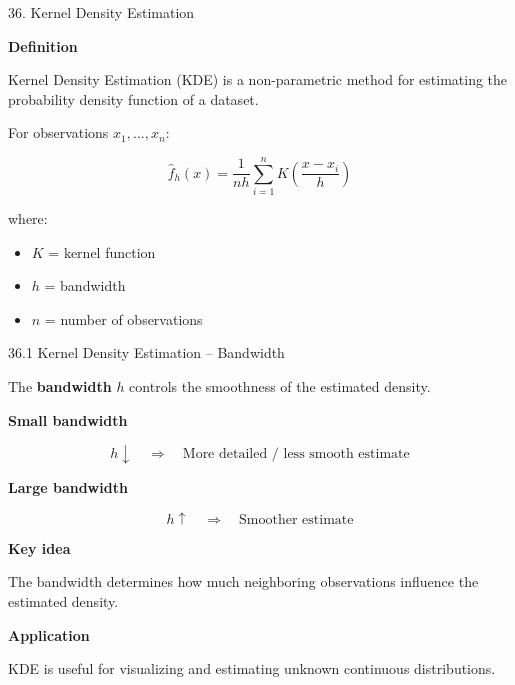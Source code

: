 \begin{frame}{36. Kernel Density Estimation}

\textbf{Definition}

Kernel Density Estimation (KDE) is a non-parametric method
for estimating the probability density function of a dataset.

\vspace{0.4cm}

For observations $x_1,\ldots,x_n$:

\[
\boxed{
\hat{f}_h(x)
=
\frac{1}{nh}
\sum_{i=1}^{n}
K\left(
\frac{x-x_i}{h}
\right)
}
\]

where:

\begin{itemize}
    \item $K$ = kernel function
    \item $h$ = bandwidth
    \item $n$ = number of observations
\end{itemize}

\end{frame}



\begin{frame}{36.1 Kernel Density Estimation -- Bandwidth}

The \textbf{bandwidth} $h$ controls the smoothness of the
estimated density.

\textbf{Small bandwidth}

\[
h\downarrow
\quad\Rightarrow\quad
\text{More detailed / less smooth estimate}
\]

\textbf{Large bandwidth}

\[
h\uparrow
\quad\Rightarrow\quad
\text{Smoother estimate}
\]

\textbf{Key idea}

The bandwidth determines how much neighboring observations
influence the estimated density.

\textbf{Application}

KDE is useful for visualizing and estimating unknown
continuous distributions.

\end{frame}




